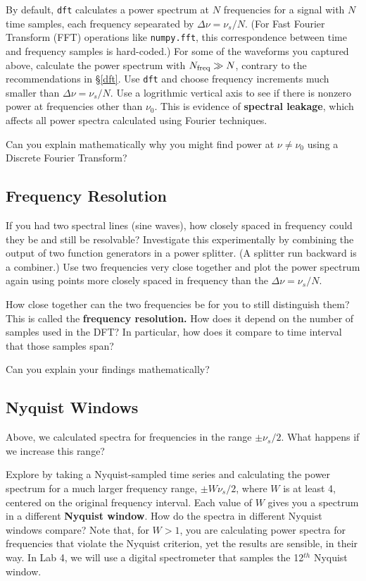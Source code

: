 \documentclass[11pt,preprint]{aastex}
\begin{document}
\noindent
By default, \verb$dft$ calculates a power spectrum at $N$ frequencies for a signal with 
$N$ time samples, each frequency sepearated by $\Delta\nu = \nu_s/N$. (For Fast Fourier Transform (FFT)
operations like \verb$numpy.fft$, this correspondence between time and frequency samples is hard-coded.) 
For some of the waveforms you captured above, calculate
the power spectrum with $N_{\rm freq}\gg N$, contrary to the
recommendations in \S \ref{dft}. Use \verb$dft$ and choose 
frequency increments much smaller than $\Delta \nu = \nu_s/N$.
Use a logrithmic vertical axis to see if there is nonzero power at
frequencies other than $\nu_0$.  This
is evidence of {\bf spectral leakage}, which affects all power spectra 
calculated using Fourier techniques. 

Can you explain mathematically why you might find power at $\nu\ne\nu_0$ using a Discrete Fourier Transform?

\subsection{Frequency Resolution} \label{freqres}

\noindent
If you had two spectral lines (sine waves), how closely spaced in frequency
could they be and still be resolvable? Investigate this experimentally by
combining the output of two function generators in a power splitter. (A splitter
run backward is a combiner.) Use two 
frequencies very close together and plot the power spectrum again
using points more closely spaced in frequency
than the $\Delta \nu = \nu_s/N$.

How close together can the two frequencies be for you to still 
distinguish them? This is called the {\bf frequency resolution.} How
does it depend on the number of samples used in the DFT? In
particular, how does it compare to time interval that
those samples span?

Can you explain your findings mathematically?

\subsection{Nyquist Windows}

\noindent
Above, we calculated spectra for frequencies in the range $\pm
\nu_s/2$. What happens if we increase this range?

Explore by
taking a Nyquist-sampled time series and calculating the power
spectrum for a much larger frequency range, $\pm W \nu_s/2$, where
$W$ is at least 4, centered on the original frequency interval. Each value
of $W$ gives you a spectrum in a different {\bf Nyquist window}. How do
the spectra in different Nyquist windows compare? Note that, for $W>1$,
you are calculating power spectra for frequencies that violate the
Nyquist criterion, yet the results are sensible, in their way. 
In Lab 4, we will use a digital spectrometer that samples the
12$^{th}$ Nyquist window.
\end{document}
